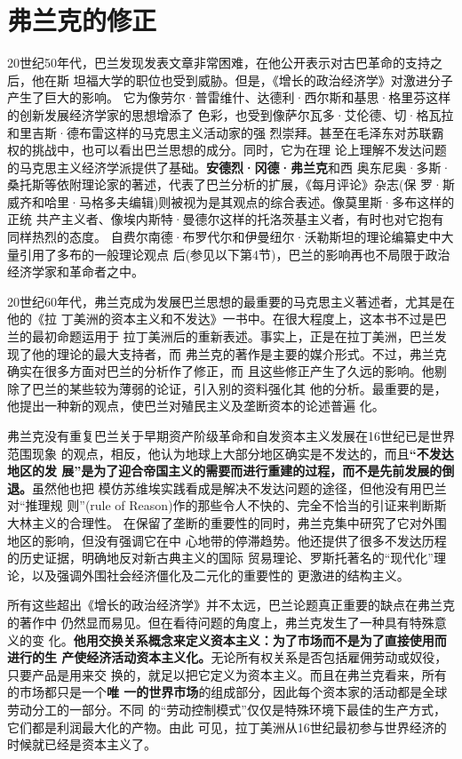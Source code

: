 \section{弗兰克的修正}

20世纪50年代，巴兰发现发表文章非常困难，在他公开表示对古巴革命的支持之后，他在斯
坦福大学的职位也受到威胁。但是，《增长的政治经济学》对激进分子产生了巨大的影响。
它为像劳尔·普雷维什、达德利·西尔斯和基思·格里芬这样的创新发展经济学家的思想增添了
色彩，也受到像萨尔瓦多·艾伦德、切·格瓦拉和里吉斯·德布雷这样的马克思主义活动家的强
烈崇拜。甚至在毛泽东对苏联霸权的挑战中，也可以看出巴兰思想的成分。同时，它为在理
论上理解不发达问题的马克思主义经济学派提供了基础。\textbf{安德烈·冈德·弗兰克}和西
奥东尼奥·多斯·桑托斯等依附理论家的著述，代表了巴兰分析的扩展，《每月评论》杂志(保
罗·斯威齐和哈里·马格多夫编辑)则被视为是其观点的综合表述。像莫里斯·多布这样的正统
共产主义者、像埃内斯特·曼德尔这样的托洛茨基主义者，有时也对它抱有同样热烈的态度。
自费尔南德·布罗代尔和伊曼纽尔·沃勒斯坦的理论编纂史中大量引用了多布的一般理论观点
后(参见以下第4节)，巴兰的影响再也不局限于政治经济学家和革命者之中。

20世纪60年代，弗兰克成为发展巴兰思想的最重要的马克思主义著述者，尤其是在他的《拉
丁美洲的资本主义和不发达》一书中。在很大程度上，这本书不过是巴兰的最初命题运用于
拉丁美洲后的重新表述。事实上，正是在拉丁美洲，巴兰发现了他的理论的最大支持者，而
弗兰克的著作是主要的媒介形式。不过，弗兰克确实在很多方面对巴兰的分析作了修正，而
且这些修正产生了久远的影响。他剔除了巴兰的某些较为薄弱的论证，引入别的资料强化其
他的分析。最重要的是，他提出一种新的观点，使巴兰对殖民主义及垄断资本的论述普遍
化。

弗兰克没有重复巴兰关于早期资产阶级革命和自发资本主义发展在16世纪已是世界范围现象
的观点，相反，他认为地球上大部分地区确实是不发达的，而且\textbf{“不发达地区的发
  展”是为了迎合帝国主义的需要而进行重建的过程，而不是先前发展的倒退。}虽然他也把
模仿苏维埃实践看成是解决不发达问题的途径，但他没有用巴兰对“推理规
则”(rule of Reason)作的那些令人不快的、完全不恰当的引证来判断斯大林主义的合理性。
在保留了垄断的重要性的同时，弗兰克集中研究了它对外围地区的影响，但没有强调它在中
心地带的停滞趋势。他还提供了很多不发达历程的历史证据，明确地反对新古典主义的国际
贸易理论、罗斯托著名的“现代化”理论，以及强调外围社会经济僵化及二元化的重要性的
更激进的结构主义。

所有这些超出《增长的政治经济学》并不太远，巴兰论题真正重要的缺点在弗兰克的著作中
仍然显而易见。但在看待问题的角度上，弗兰克发生了一种具有特殊意义的变
化。\textbf{他用交换关系概念来定义资本主义：为了市场而不是为了直接使用而进行的生
  产使经济活动资本主义化。}无论所有权关系是否包括雇佣劳动或奴役，只要产品是用来交
换的，就足以把它定义为资本主义。而且在弗兰克看来，所有的市场都只是一个\textbf{唯
  一的世界市场}的组成部分，因此每个资本家的活动都是全球劳动分工的一部分。不同
的“劳动控制模式”仅仅是特殊环境下最佳的生产方式，它们都是利润最大化的产物。由此
可见，拉丁美洲从16世纪最初参与世界经济的时候就已经是资本主义了。

